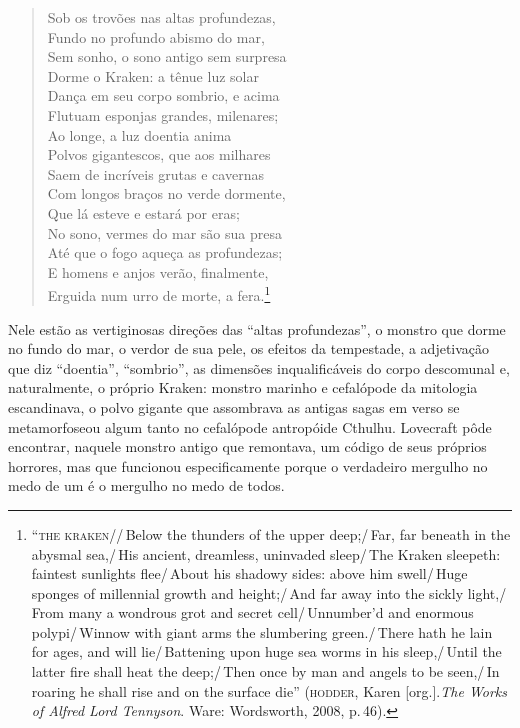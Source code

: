\begin{verse}\noindent
Sob os trovões nas altas profundezas,\\
Fundo no profundo abismo do mar,\\
Sem sonho, o sono antigo sem surpresa\\
Dorme o Kraken: a tênue luz solar\\
Dança em seu corpo sombrio, e acima\\
Flutuam esponjas grandes, milenares;\\
Ao longe, a luz doentia anima\\
Polvos gigantescos, que aos milhares\\
Saem de incríveis grutas e cavernas\\
Com longos braços no verde dormente,\\
Que lá esteve e estará por eras;\\
No sono, vermes do mar são sua presa\\
Até que o fogo aqueça as profundezas;\\
E homens e anjos verão, finalmente,\\
Erguida num urro de morte, a fera.\footnote{``\textsc{the kraken}//\,Below the
  thunders of the upper deep;/\,Far, far beneath in the abysmal sea,/\,His
  ancient, dreamless, uninvaded sleep/\,The Kraken sleepeth: faintest
  sunlights flee/\,About his shadowy sides: above him swell/\,Huge sponges
  of millennial growth and height;/\,And far away into the sickly
  light,/\,From many a wondrous grot and secret cell/\,Unnumber'd and
  enormous polypi/\,Winnow with giant arms the slumbering green./\,There
  hath he lain for ages, and will lie/\,Battening upon huge sea worms in
  his sleep,/\,Until the latter fire shall heat the deep;/\,Then once by man
  and angels to be seen,/\,In roaring he shall rise and on the surface
  die'' (\textsc{hodder}, Karen [org.].\emph{The Works of Alfred Lord Tennyson}. 
  Ware: Wordsworth, 2008, p.\,46).}
\end{verse}

Nele estão as vertiginosas direções das ``altas profundezas'', o monstro
que dorme no fundo do mar, o verdor de sua pele, os efeitos da
tempestade, a adjetivação que diz ``doentia'', ``sombrio'', as dimensões
inqualificáveis do corpo descomunal e, naturalmente, o próprio Kraken:
monstro marinho e cefalópode da mitologia escandinava, o polvo gigante
que assombrava as antigas sagas em verso se metamorfoseou algum tanto no
cefalópode antropóide Cthulhu. Lovecraft pôde encontrar, naquele monstro
antigo que remontava, um código de seus próprios horrores, mas que
funcionou especificamente porque o verdadeiro mergulho no medo de um é o
mergulho no medo de todos.

